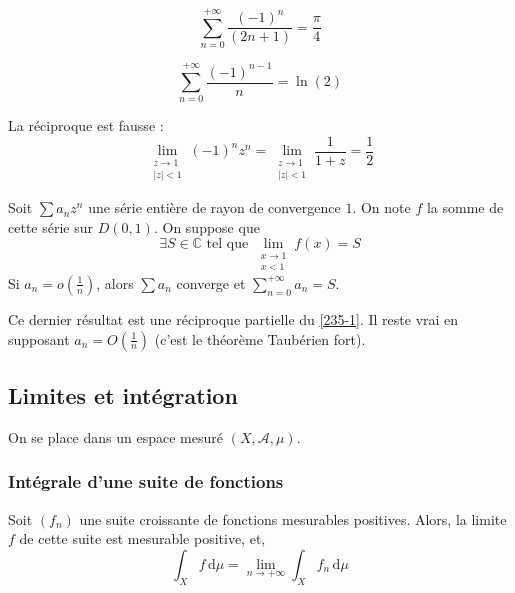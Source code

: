 	\begin{application}
		\[ \sum_{n=0}^{+\infty} \frac{(-1)^n}{(2n+1)} = \frac{\pi}{4} \]
	\end{application}

	\begin{application}
		\[ \sum_{n=0}^{+\infty} \frac{(-1)^{n-1}}{n} = \ln(2) \]
	\end{application}

	\begin{cexample}
		La réciproque est fausse :
		\[ \lim_{\substack{z \rightarrow 1 \\ \vert z \vert < 1}} (-1)^n z^n = \lim_{\substack{z \rightarrow 1 \\ \vert z \vert < 1}} \frac{1}{1+z} = \frac{1}{2} \]
	\end{cexample}

	\begin{theorem}
		Soit $\sum a_n z^n$ une série entière de rayon de convergence $1$. On note $f$ la somme de cette série sur $D(0,1)$. On suppose que
		\[ \exists S \in \mathbb{C} \text{ tel que } \lim_{\substack{x \rightarrow 1 \\ x < 1}} f(x) = S \]
		Si $a_n = o \left( \frac{1}{n} \right)$, alors $\sum a_n$ converge et $\sum_{n=0}^{+\infty} a_n = S$.
	\end{theorem}

	\begin{remark}
		Ce dernier résultat est une réciproque partielle du \cref{235-1}. Il reste vrai en supposant $a_n = O \left( \frac{1}{n} \right)$ (c'est le théorème Taubérien fort).
	\end{remark}

	\subsection{Limites et intégration}

	On se place dans un espace mesuré $(X, \mathcal{A}, \mu)$.

	\subsubsection{Intégrale d'une suite de fonctions}


	\begin{theorem}
		Soit $(f_n)$ une suite croissante de fonctions mesurables positives. Alors, la limite $f$ de cette suite est mesurable positive, et,
		\[ \int_X f \, \mathrm{d}\mu = \lim_{n \rightarrow +\infty} \int_X f_n \, \mathrm{d}\mu \]
	\end{theorem}

